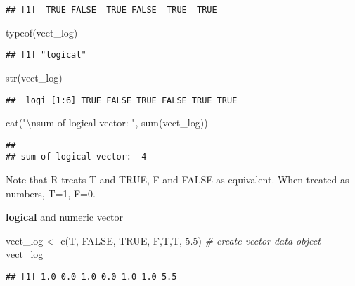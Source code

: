 \documentclass[
]{article}
\newenvironment{Shaded}{\begin{snugshade}}{\end{snugshade}}
\newcommand{\CommentTok}[1]{\textcolor[rgb]{0.56,0.35,0.01}{\textit{#1}}}
\newcommand{\ConstantTok}[1]{\textcolor[rgb]{0.00,0.00,0.00}{#1}}
\newcommand{\FloatTok}[1]{\textcolor[rgb]{0.00,0.00,0.81}{#1}}
\newcommand{\FunctionTok}[1]{\textcolor[rgb]{0.00,0.00,0.00}{#1}}
\newcommand{\NormalTok}[1]{#1}
\newcommand{\OtherTok}[1]{\textcolor[rgb]{0.56,0.35,0.01}{#1}}
\newcommand{\SpecialCharTok}[1]{\textcolor[rgb]{0.00,0.00,0.00}{#1}}
\newcommand{\StringTok}[1]{\textcolor[rgb]{0.31,0.60,0.02}{#1}}
\begin{document}
\begin{verbatim}
## [1]  TRUE FALSE  TRUE FALSE  TRUE  TRUE
\end{verbatim}

\begin{Shaded}
\begin{Highlighting}[]
\FunctionTok{typeof}\NormalTok{(vect\_log)}
\end{Highlighting}
\end{Shaded}

\begin{verbatim}
## [1] "logical"
\end{verbatim}

\begin{Shaded}
\begin{Highlighting}[]
\FunctionTok{str}\NormalTok{(vect\_log)}
\end{Highlighting}
\end{Shaded}

\begin{verbatim}
##  logi [1:6] TRUE FALSE TRUE FALSE TRUE TRUE
\end{verbatim}

\begin{Shaded}
\begin{Highlighting}[]
\FunctionTok{cat}\NormalTok{(}\StringTok{"}\SpecialCharTok{\textbackslash{}n}\StringTok{sum of logical vector: "}\NormalTok{, }\FunctionTok{sum}\NormalTok{(vect\_log))}
\end{Highlighting}
\end{Shaded}

\begin{verbatim}
## 
## sum of logical vector:  4
\end{verbatim}

Note that R treats T and TRUE, F and FALSE as equivalent. When treated
as numbers, T=1, F=0.

\textbf{logical} and numeric vector

\begin{Shaded}
\begin{Highlighting}[]
\NormalTok{vect\_log }\OtherTok{\textless{}{-}} \FunctionTok{c}\NormalTok{(T, }\ConstantTok{FALSE}\NormalTok{, }\ConstantTok{TRUE}\NormalTok{, F,T,T, }\FloatTok{5.5}\NormalTok{) }\CommentTok{\# create vector data object}
\NormalTok{vect\_log}
\end{Highlighting}
\end{Shaded}

\begin{verbatim}
## [1] 1.0 0.0 1.0 0.0 1.0 1.0 5.5
\end{verbatim}
\end{document}
